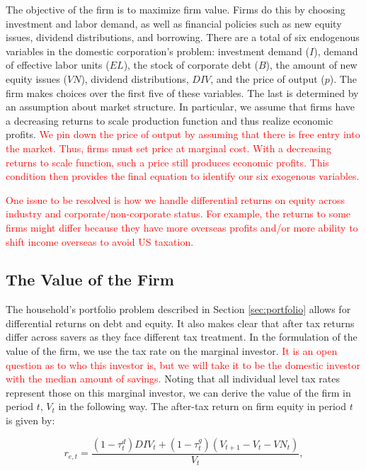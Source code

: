 The objective of the firm is to maximize firm value.  Firms do this by choosing investment and labor demand, as well as financial policies such as new equity issues, dividend distributions, and borrowing.  There are a total of six endogenous variables in the domestic corporation's problem: investment demand ($I$), demand of effective labor units ($EL$), the stock of corporate debt ($B$), the amount of new equity issues ($VN$), dividend distributions, $DIV$, and the price of output ($p$).  The firm makes choices over the first five of these variables.  The last is determined by an assumption about market structure.  In particular, we assume that firms have a decreasing returns to scale production function and thus realize economic profits.  \textcolor{red}{We pin down the price of output by assuming that there is free entry into the market.  Thus, firms must set price at marginal cost.  With a decreasing returns to scale function, such a price still produces economic profits.  This condition then provides the final equation to identify our six exogenous variables.} 



\textcolor{red}{One issue to be resolved is how we handle differential returns on equity across industry and corporate/non-corporate status.  For example, the returns to some firms might differ because they have more overseas profits and/or more ability to shift income overseas to avoid US taxation.}

\subsection{The Value of the Firm}

The household's portfolio problem described in Section \ref{sec:portfolio} allows for differential returns on debt and equity.  It also makes clear that after tax returns differ across savers as they face different tax treatment.  In the formulation of the value of the firm, we use the tax rate on the marginal investor.  \textcolor{red}{It is an open question as to who this investor is, but we will take it to be the domestic investor with the median amount of savings.}  Noting that all individual level tax rates represent those on this marginal investor, we can derive the value of the firm in period $t$, $V_{t}$ in the following way.  The after-tax return on firm equity in period $t$ is given by:

\begin{equation}
\label{eqn:equity_return}
r_{e,t} = \frac{(1-\tau^{d}_{t})DIV_{t}+(1-\tau^{g}_{t})(V_{t+1}-V_{t}-VN_{t})}{V_{t}},
\end{equation} 


